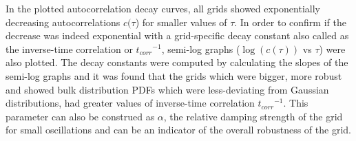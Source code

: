 In the plotted autocorrelation decay curves, all grids showed exponentially decreasing autocorrelations $c(\tau$) for smaller values of $\tau$. In order to confirm if the decrease was indeed exponential with a grid-specific decay constant also called as the inverse-time correlation or ${t_{corr}}^{-1}$, semi-log graphs ($\log(c(\tau))$ vs $\tau$) were also plotted. The decay constants were computed by calculating the slopes of the semi-log graphs and it was found that the grids which were bigger, more robust and showed bulk distribution PDFs which were less-deviating from Gaussian distributions, had greater values of inverse-time correlation ${t_{corr}}^{-1}$. This parameter can also be construed as $\alpha$, the relative damping strength of the grid for small oscillations and can be an indicator of the overall robustness of the grid.